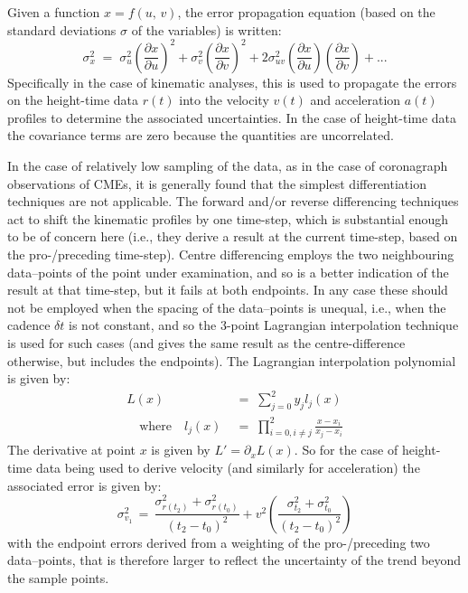 \documentclass[structabstract]{aa}
\begin{document}
Given a function $x=f(u,\,v)$, the error propagation equation (based on the standard deviations $\sigma$ of the variables) is written:
\begin{equation}
\label{eqn_errorprop}
\sigma_x^2 \; = \; \sigma_u^2 \left(\frac{\partial x}{\partial u}\right) ^2 + \sigma_v^2 \left( \frac{\partial x}{\partial v} \right) ^2 + 2 \sigma_{uv}^2 \left( \frac{\partial x}{\partial u} \right) \left( \frac{\partial x}{\partial v} \right) + ...
\end{equation}
Specifically in the case of kinematic analyses, this is used to propagate the errors on the height-time data $r(t)$ into the velocity $v(t)$ and acceleration $a(t)$ profiles to determine the associated uncertainties. In the case of height-time data the covariance terms are zero because the quantities are uncorrelated.

In the case of relatively low sampling of the data, as in the case of coronagraph observations of CMEs, it is generally found that the simplest differentiation techniques are not applicable. The forward and/or reverse differencing techniques act to shift the kinematic profiles by one time-step, which is substantial enough to be of concern here (i.e., they derive a result at the current time-step, based on the pro-/preceding time-step). Centre differencing employs the two neighbouring data--points of the point under examination, and so is a better indication of the result at that time-step, but it fails at both endpoints. In any case these should not be employed when the spacing of the data--points is unequal, i.e., when the cadence $\delta t$ is not constant, and so the 3-point Lagrangian interpolation technique is used for such cases (and gives the same result as the centre-difference otherwise, but includes the endpoints). The Lagrangian interpolation polynomial is given by:
\begin{eqnarray}
L(x) \; &=\; \sum_{j=0}^2 y_j l_j(x) \\ \quad \mbox{where} \quad
l_j(x) \; &=\; \prod_{i=0, i\neq j}^2 \frac{x-x_i}{x_j-x_i} 
\end{eqnarray}
The derivative at point $x$ is given by $L'=\partial_x L(x)$. So for the case of height-time data being used to derive velocity (and similarly for acceleration) the associated error is given by:
\begin{equation}
\sigma_{v_1}^2 \,=\, \frac{\sigma_{r(t_2)}^2+\sigma_{r(t_0)}^2}{(t_2-t_0)^2} + v^2 \left( \frac{\sigma_{t_2}^2+\sigma_{t_0}^2}{(t_2-t_0)^2} \right)
\label{vel_err}
\end{equation}
with the endpoint errors derived from a weighting of the pro-/preceding two data--points, that is therefore larger to reflect the uncertainty of the trend beyond the sample points.
\end{document}
